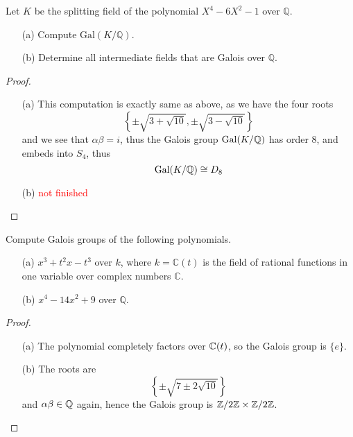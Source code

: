 \begin{prob}[S2008-Q3]
    Let \(K\) be the splitting field of the polynomial \(X^4 - 6X^2 - 1\) over \(\mathbb{Q}\).
    \begin{itemize}
        \item[(a)] Compute \(\text{Gal}(K/\mathbb{Q})\).
        \item[(b)] Determine all intermediate fields that are Galois over \(\mathbb{Q}\).
    \end{itemize}
\end{prob}
\begin{proof}
    \begin{itemize}
        \item[(a)] This computation is exactly same as above, as we have the four roots 
        \begin{equation*}
            \left\{\pm\sqrt{3+\sqrt{10}}, \pm\sqrt{3-\sqrt{10}}\right\}
        \end{equation*}
        and we see that $\alpha\beta=i$, thus the Galois group $\text{Gal}(K/\mathbb{Q})$ has order $8$, and embeds into $S_4$, thus 
        \begin{equation*}
            \text{Gal}(K/\mathbb{Q})\cong D_8
        \end{equation*}
        \item[(b)] \textcolor{red}{not finished}
    \end{itemize}
\end{proof}





\begin{prob}[S2010-Q3]
    Compute Galois groups of the following polynomials.
    \begin{itemize}
        \item[(a)] \(x^3 + t^2x - t^3\) over \(k\), where \(k = \mathbb{C}(t)\) is the field of rational functions in one variable over complex numbers \(\mathbb{C}\).
        \item[(b)] \(x^4 - 14x^2 + 9\) over \(\mathbb{Q}\).
    \end{itemize}
\end{prob}
\begin{proof}
    \begin{itemize}
        \item[(a)] The polynomial completely factors over $\mathbb{C}(t)$, so the Galois group is $\{e\}$.
        \item[(b)] The roots are 
        \begin{equation*}
            \left\{\pm\sqrt{7\pm 2\sqrt{10}}\right\}
        \end{equation*}
        and $\alpha\beta\in\mathbb{Q}$ again, hence the Galois group is $\mathbb{Z}/2\mathbb{Z}\times\mathbb{Z}/2\mathbb{Z}$.
    \end{itemize}
\end{proof}


